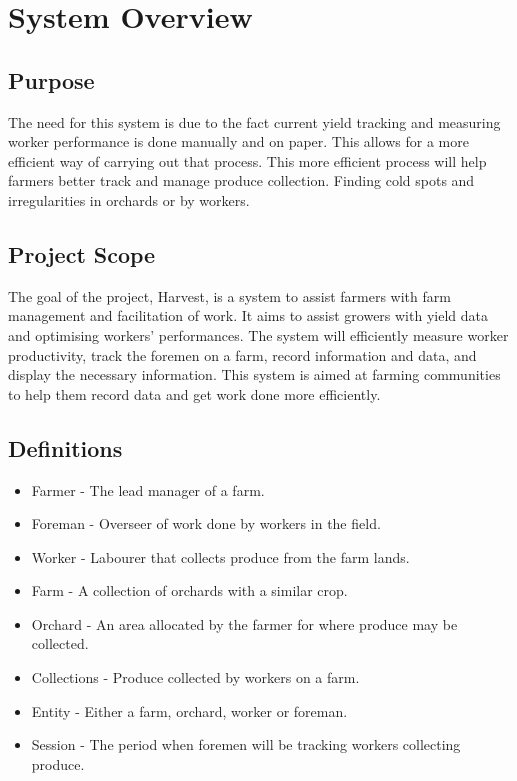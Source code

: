 \documentclass[11pt]{article}
\begin{document}
\newpage
{}
\tableofcontents
\newpage
\listoffigures

\newpage
{}

\newpage
\section{System Overview}

\subsection{Purpose}
The need for this system is due to the fact current yield tracking and measuring worker performance is done manually and on paper. This allows for a more efficient way of carrying out that process. This more efficient process will help farmers better track and manage produce collection. Finding cold spots and irregularities in orchards or by workers.

\subsection{Project Scope}
The goal of the project, Harvest, is a  system to assist farmers with farm management and facilitation of work. It aims to assist growers with yield data and optimising workers' performances. The system will efficiently measure worker productivity, track the foremen on a farm, record information and data, and display the necessary information. This system is aimed at farming communities to help them record data and get work done more efficiently.

\subsection{Definitions}
\begin{itemize}
\item Farmer - The lead manager of a farm.
\item Foreman - Overseer of work done by workers in the field.
\item Worker - Labourer that collects produce from the farm lands.
\item Farm - A collection of orchards with a similar crop.
\item Orchard - An area allocated by the farmer for where produce may be collected.
\item Collections - Produce collected by workers on a farm.
\item Entity - Either a farm, orchard, worker or foreman.
\item Session - The period when foremen will be tracking workers collecting produce.
\end{itemize}
\end{document}
